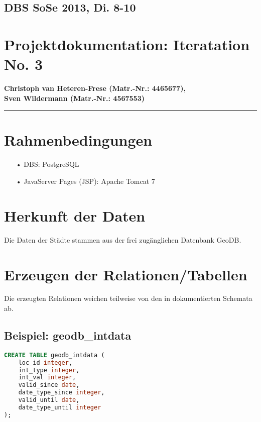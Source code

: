 \documentclass[11pt,a4paper,DIV=10,]{scrartcl}
\begin{document}

\subsection*{DBS SoSe 2013, Di. 8-10}
\section*{Projektdokumentation: Iteratation No. 3}
\textbf{Christoph van Heteren-Frese (Matr.-Nr.: 4465677), \\ Sven Wildermann (Matr.-Nr.: 4567553) }
\hrule
\section{Rahmenbedingungen}
\begin{enumerate}
\item[•] DBS: PostgreSQL
\item[•]JavaServer Pages (JSP): Apache Tomcat 7
\end{enumerate}
\section{Herkunft der Daten}
Die Daten der Städte stammen aus der frei zugänglichen Datenbank GeoDB.
\section{Erzeugen der Relationen/Tabellen}
Die erzeugten Relationen weichen teilweise von den in \citep{geodb.org} dokumentierten Schemata ab. 
\subsection*{Beispiel: geodb\_intdata}
\begin{lstlisting}[language=sql]
CREATE TABLE geodb_intdata (
    loc_id integer,
    int_type integer,
    int_val integer,
    valid_since date,
    date_type_since integer,
    valid_until date,
    date_type_until integer
);
\end{lstlisting}
\end{document}
